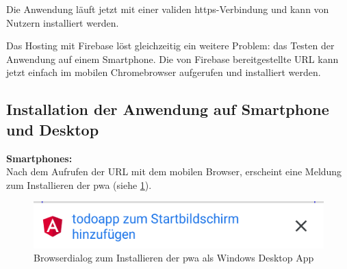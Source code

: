 Die Anwendung läuft jetzt mit einer validen \ac{https}-Verbindung und kann von Nutzern installiert werden.

Das Hosting mit Firebase löst gleichzeitig ein weitere Problem: das Testen der Anwendung auf einem Smartphone. Die von Firebase bereitgestellte URL kann jetzt einfach im mobilen Chromebrowser aufgerufen und installiert werden.

\subsection{Installation der Anwendung auf Smartphone und Desktop}
\textbf{Smartphones:}\\
Nach dem Aufrufen der URL mit dem mobilen Browser, erscheint eine Meldung zum Installieren der \ac{pwa} (siehe \ref{fig:dialog_install_pwa_mobile}).

\begin{figure}[h]
	\includegraphics[scale=0.5]{img/pwa_add_to_homescreen.png}
	\centering
	\caption{Browserdialog zum Installieren der \ac{pwa} als Windows Desktop App}
	\label{fig:dialog_install_pwa_mobile}
\end{figure}

